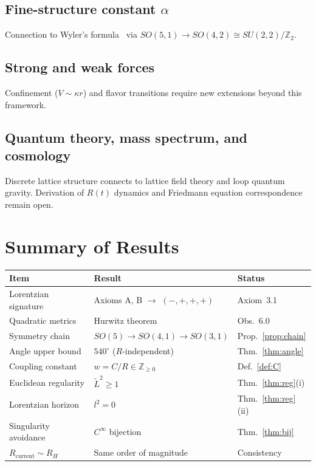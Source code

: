 \documentclass[12pt,a4paper]{article}
\begin{document}
\subsection{Fine-structure constant $\alpha$}
Connection to Wyler's formula~\cite{Wyler1971} via $SO(5,1) \to SO(4,2) \cong SU(2,2)/\mathbb{Z}_2$.

\subsection{Strong and weak forces}
Confinement ($V \sim \kappa r$) and flavor transitions require new extensions beyond this framework.

\subsection{Quantum theory, mass spectrum, and cosmology}
Discrete lattice structure connects to lattice field theory and loop quantum gravity. Derivation of $R(t)$ dynamics and Friedmann equation correspondence remain open.

\section*{Summary of Results}

\begin{center}
\begin{tabular}{lll}
\toprule
Item & Result & Status \\
\midrule
Lorentzian signature & Axioms A, B $\to$ $(-,+,+,+)$ & Axiom~3.1 \\
Quadratic metrics & Hurwitz theorem & Obs.~6.0 \\
Symmetry chain & $SO(5) \to SO(4,1) \to SO(3,1)$ & Prop.~\ref{prop:chain} \\
Angle upper bound & $540^\circ$ ($R$-independent) & Thm.~\ref{thm:angle} \\
Coupling constant & $w = C/R \in \mathbb{Z}_{\geq 0}$ & Def.~\ref{def:C} \\
Euclidean regularity & $\tilde{L}^2 \geq 1$ & Thm.~\ref{thm:reg}(i) \\
Lorentzian horizon & $l^2 = 0$ & Thm.~\ref{thm:reg}(ii) \\
Singularity avoidance & $C^\infty$ bijection & Thm.~\ref{thm:bij} \\
$R_{\text{current}} \sim R_H$ & Same order of magnitude & Consistency \\
\bottomrule
\end{tabular}
\end{center}
\end{document}
